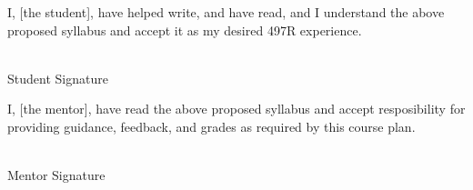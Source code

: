 \documentclass[12pt]{article}
\begin{document}
I, [the student], have helped write, and have read, and I understand the above proposed syllabus and accept it as my desired 497R experience.

\vspace{2em}

\noindent \makebox[2.5in]{\hrulefill} \hspace {1.0in}\makebox[2.5in]{\hrulefill} \\
Student Signature  \\

\bigskip

I, [the mentor], have read the above proposed syllabus and accept resposibility for providing guidance, feedback, and grades as required by this course plan.

\vspace{2em}

\noindent \makebox[2.5in]{\hrulefill} \hspace {1.0in}\makebox[2.5in]{\hrulefill} \\
Mentor Signature  \\
\end{document}
